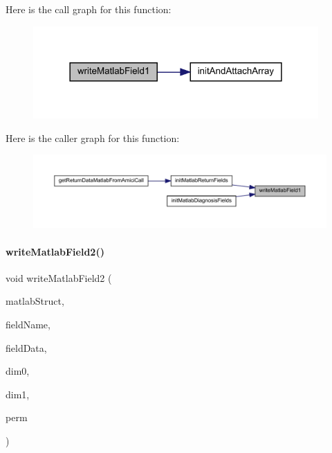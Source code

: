 Here is the call graph for this function\+:
\nopagebreak
\begin{figure}[H]
\begin{center}
\leavevmode
\includegraphics[width=309pt]{namespaceamici_a64677d9f7279591de5f36ab162fbf54b_cgraph}
\end{center}
\end{figure}
Here is the caller graph for this function\+:
\nopagebreak
\begin{figure}[H]
\begin{center}
\leavevmode
\includegraphics[width=350pt]{namespaceamici_a64677d9f7279591de5f36ab162fbf54b_icgraph}
\end{center}
\end{figure}
\mbox{\label{namespaceamici_aab2bcdb74e3b44bb65e12b14d3ffb42b}} 
\paragraph{\texorpdfstring{writeMatlabField2()}{writeMatlabField2()}}
{\footnotesize\ttfamily void write\+Matlab\+Field2 (\begin{DoxyParamCaption}\item[{mx\+Array $\ast$}]{matlab\+Struct,  }\item[{const char $\ast$}]{field\+Name,  }\item[{std\+::vector$<$ T $>$ const \&}]{field\+Data,  }\item[{int}]{dim0,  }\item[{int}]{dim1,  }\item[{std\+::vector$<$ int $>$}]{perm }\end{DoxyParamCaption})}


